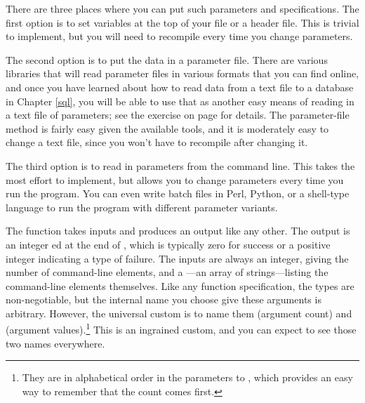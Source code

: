 There are three places where you can put such parameters and
specifications. The first option is to set variables at the top of your 
file or a header file. This is trivial to implement, but you will need
to recompile every time you change parameters.

The second option is to put the data in a parameter file. There are
various libraries that will read parameter files in various formats that
you can find online, and once you have learned about how to read data
from a text file to a database in Chapter \ref{sql}, you will be able to
use that as another easy means of reading in a text file of
parameters; see the exercise on page \pageref{paramex} for details.
The parameter-file method is fairly easy given the available tools, and it is
moderately easy to change a text file, since you won't have to recompile
after changing it.

The third option is to read in parameters from the command line. This
takes the most effort to implement, but allows you to change parameters
every time you run the program. You can even write batch files in Perl,
Python, or a shell-type language to run the program with different parameter variants.

The  function takes inputs and produces an output like any
other. The output is an integer ed at the end of ,
which is typically zero for success or a positive integer indicating
a type of failure. The inputs are always an integer, giving the number
of command-line elements, and a ---an array of
strings---listing the command-line elements themselves. 
Like any function specification, the types are non-negotiable, but the
internal name you choose give these arguments is arbitrary. However, the
universal custom is to name them  (argument count) and
 (argument values).\footnote{They are in alphabetical order
in the parameters to , which provides an easy way to remember
that the count comes first.} This is an ingrained custom, and you can
expect to see those two names everywhere.


